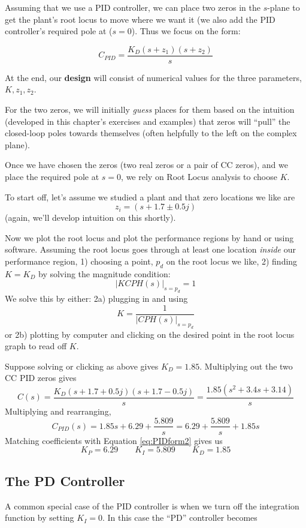 Assuming that we use a PID controller, we can place two zeros in the $s$-plane to get the plant's root
locus to move where we want it (we also add the PID controller's required pole at ($s=0$).
Thus we focus on the form:

\[
C_{PID} = \frac {K_D(s+z_1)(s+z_2)}  {s}
\]

At the end, our {\bf design} will consist of numerical values for the three parameters, $K, z_1, z_2$.

For the two zeros, we will initially {\it guess} places for them based on
the intuition (developed in this chapter's exercises and examples)
that zeros will ``pull'' the closed-loop poles towards themselves (often helpfully to the left on the complex plane).

Once we have chosen the zeros (two real zeros or a pair of CC zeros), and we place the
required pole at $s=0$, we rely on Root Locus analysis to choose $K$.

To start off, let's assume we studied a plant and that zero locations we like are
\[
z_i = (s + 1.7 \pm 0.5j)
\]
(again, we'll develop intuition on this shortly).

Now we plot the root locus and plot the performance regions by hand or using software.
Assuming the root locus goes through at least
one location {\it inside} our performance region,
1) choosing a point, $p_d$ on the root locus we like,
2) finding $K=K_D$ by solving the magnitude condition:
\[
\left | KCPH(s) \right|_{s=p_d} =1
\]
We solve this by either:
2a) plugging in and using
\[
K = \frac{1}{\left | CPH(s) \right|_{s=p_d}}
\]
or 2b) plotting by computer and clicking on the desired point in the root locus graph to read off $K$.


Suppose solving or clicking as above gives $K_D = 1.85$.
Multiplying out the two CC PID zeros gives
\[
C(s) = \frac{K_D(s + 1.7 + 0.5j)(s + 1.7 - 0.5j)}{s}  = \frac{1.85(s^2 + 3.4s + 3.14)}{s}
\]
Multiplying and rearranging,
\[
C_{PID}(s) = 1.85s + 6.29 + \frac {5.809} {s} = 6.29 + \frac {5.809} {s} + 1.85s
\]
Matching coefficients with Equation \ref{eq:PIDform2} gives us
\[
K_P  = 6.29   \qquad  K_I =  5.809 \qquad K_D = 1.85
\]


\subsection{The PD Controller}
A common special case of the PID controller is when we turn off the
integration function by setting $K_I=0$.
In this case the ``PD''  controller becomes

